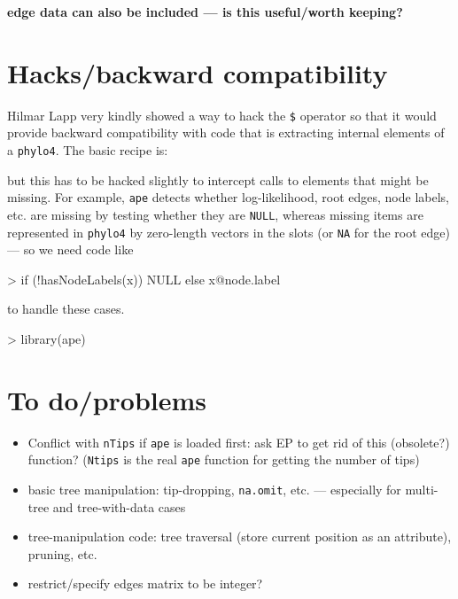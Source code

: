 \documentclass{article}
\newcommand{\code}[1]{{{\tt #1}}}
\begin{document}
\textbf{edge data can also be included --- is this
useful/worth keeping?}
 
\section{Hacks/backward compatibility}

Hilmar Lapp very kindly showed a way to hack
the \verb+$+ operator so that it would provide
backward compatibility with code that is 
extracting internal elements of a \code{phylo4}.
The basic recipe is:
\begin{Schunk}
\end{Schunk}
but this has to be hacked slightly to intercept
calls to elements that might be missing.  For example,
\code{ape} detects whether log-likelihood, root edges,
node labels, etc. are missing by testing whether they
are \code{NULL}, whereas missing items are represented
in \code{phylo4} by zero-length vectors in the slots 
(or \code{NA} for the root edge) --- so we need code
like
\begin{Schunk}
\begin{Sinput}
> if (!hasNodeLabels(x)) NULL else x@node.label
\end{Sinput}
\end{Schunk}
to handle these cases.

\begin{Schunk}
\begin{Sinput}
> library(ape)
\end{Sinput}
\end{Schunk}
\section{To do/problems}

\begin{itemize}
\item Conflict with \code{nTips} if \code{ape} is loaded first:
ask EP to get rid of this (obsolete?) function? (\code{Ntips}
is the real \code{ape} function for getting the number of tips)
\item basic tree manipulation: tip-dropping, \code{na.omit}, etc. --- 
  especially for multi-tree and tree-with-data cases
\item tree-manipulation code: tree traversal (store current
  position as an attribute), pruning, etc.
\item restrict/specify edges matrix to be integer?
\end{itemize}
\end{document}
